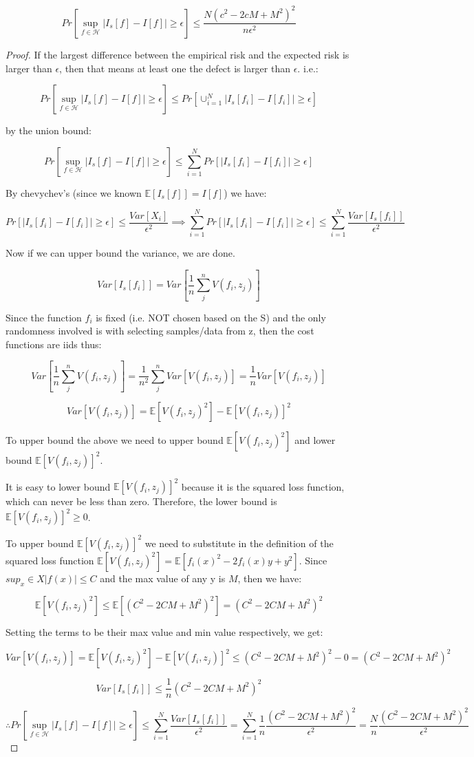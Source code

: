 \documentclass[12pt]{report}
\begin{document}
$$Pr[ \sup\limits_{f \in \mathcal{H}}  | I_s[f] - I[f] | \geq \epsilon] \leq \frac{N(c^2-2cM+M^2)^2}{n \epsilon^2}$$
\begin{proof}
If the largest difference between the empirical risk and the expected risk is larger than $\epsilon$, then that means at least one the defect is larger than $\epsilon$. i.e.:

$$Pr[ \sup\limits_{f \in \mathcal{H}}  | I_s[f] - I[f] | \geq \epsilon] \leq Pr[\cup^{N}_{i=1} | I_s[f_i] - I[f_i] | \geq \epsilon] $$

by the union bound:

$$Pr[ \sup\limits_{f \in \mathcal{H}}  | I_s[f] - I[f] | \geq \epsilon]  \leq \sum^{N}_{i=1} Pr[| I_s[f_i] - I[f_i] | \geq \epsilon] $$

By chevychev's (since we known $\mathbb{E}[I_s[f]] = I[f]$) we have:

$$ Pr[ | I_s[f_i] - I[f_i] | \geq \epsilon] \leq \frac{ Var[X_i] }{ \epsilon^2 } \implies \sum^{N}_{i=1} Pr[| I_s[f_i] - I[f_i] | \geq \epsilon] \leq \sum^{N}_{i=1} \frac{ Var[I_s[f_i]] }{ \epsilon^2 }$$

Now if we can upper bound the variance, we are done.

$$ Var[I_s[f_i]] = Var[\frac{1}{n} \sum^n_j V(f_i,z_j)]$$

Since the function $f_i$ is fixed (i.e. NOT chosen based on the S) and the only randomness involved is with selecting samples/data from z, then the cost functions are iids thus:

$$ Var[\frac{1}{n} \sum^n_j V(f_i,z_j)] = \frac{1}{n^2} \sum^n_j Var[V(f_i,z_j)] = \frac{1}{n}Var[V(f_i,z_j)]  $$

$$Var[V(f_i,z_j)] = \mathbb{E}[V(f_i,z_j)^2] - \mathbb{E}[V(f_i,z_j)]^2$$

To upper bound the above we need to upper bound $\mathbb{E}[V(f_i,z_j)^2]$ and lower bound $\mathbb{E}[V(f_i,z_j)]^2$. 

It is easy to lower bound $\mathbb{E}[V(f_i,z_j)]^2$ because it is the squared loss function, which can never be less than zero. Therefore, the lower bound is $\mathbb{E}[V(f_i,z_j)]^2 \geq 0$.

To upper bound  $\mathbb{E}[V(f_i,z_j)]^2$ we need to substitute in the definition of the squared loss function $\mathbb{E}[V(f_i,z_j)^2] = \mathbb{E}[f_i(x)^2 - 2f_i(x)y + y^2] $. Since $sup_x \in X |f(x)| \leq C$ and the max value of any y is $M$, then we have:

$$\mathbb{E}[V(f_i,z_j)^2] \leq \mathbb{E}[(C^2 - 2CM + M^2)^2] = (C^2 - 2CM + M^2)^2 $$

Setting the terms to be their max value and min value respectively, we get:

$$Var[V(f_i,z_j)] = \mathbb{E}[V(f_i,z_j)^2] - \mathbb{E}[V(f_i,z_j)]^2 \leq (C^2 - 2CM + M^2)^2 - 0 = (C^2 - 2CM + M^2)^2$$

$$Var[I_s[f_i]] \leq \frac{1}{n} (C^2 - 2CM + M^2)^2$$

$$ \therefore Pr[ \sup\limits_{f \in \mathcal{H}}  | I_s[f] - I[f] | \geq \epsilon] \leq \sum^{N}_{i=1} \frac{ Var[I_s[f_i]] }{ \epsilon^2 } = \sum^{N}_{i=1} \frac{1}{n} \frac{ (C^2 - 2CM + M^2)^2 }{ \epsilon^2 } = \frac{N}{n} \frac{ (C^2 - 2CM + M^2)^2 }{ \epsilon^2 }$$
\end{proof}
\end{document}
